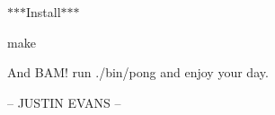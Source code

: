 $\ast$$\ast$$\ast$\+Install$\ast$$\ast$$\ast$

{\ttfamily make}

And B\+A\+M! run {\ttfamily ./bin/pong} and enjoy your day.

-- J\+U\+S\+T\+I\+N E\+V\+A\+N\+S -- 